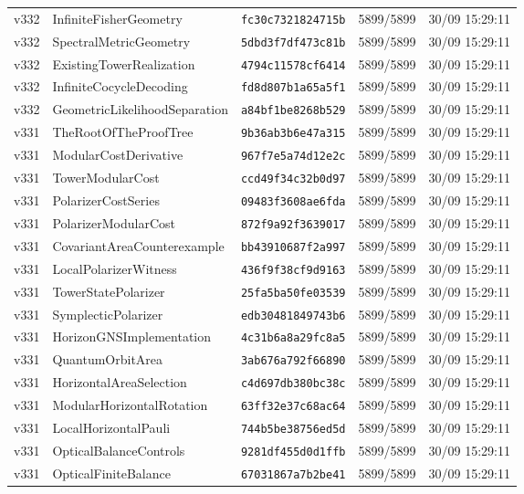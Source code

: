 \documentclass[11pt]{article}
\theoremstyle{definition}\newtheorem{deriv}{Derivation}
\begin{document}
{\begin{longtable}{@{}lllll@{}}
v332 & InfiniteFisherGeometry & \texttt{fc30c7321824715b} & 5899/5899 & 30/09 15:29:11 \\
v332 & SpectralMetricGeometry & \texttt{5dbd3f7df473c81b} & 5899/5899 & 30/09 15:29:11 \\
v332 & ExistingTowerRealization & \texttt{4794c11578cf6414} & 5899/5899 & 30/09 15:29:11 \\
v332 & InfiniteCocycleDecoding & \texttt{fd8d807b1a65a5f1} & 5899/5899 & 30/09 15:29:11 \\
v332 & GeometricLikelihoodSeparation & \texttt{a84bf1be8268b529} & 5899/5899 & 30/09 15:29:11 \\
v331 & TheRootOfTheProofTree & \texttt{9b36ab3b6e47a315} & 5899/5899 & 30/09 15:29:11 \\
v331 & ModularCostDerivative & \texttt{967f7e5a74d12e2c} & 5899/5899 & 30/09 15:29:11 \\
v331 & TowerModularCost & \texttt{ccd49f34c32b0d97} & 5899/5899 & 30/09 15:29:11 \\
v331 & PolarizerCostSeries & \texttt{09483f3608ae6fda} & 5899/5899 & 30/09 15:29:11 \\
v331 & PolarizerModularCost & \texttt{872f9a92f3639017} & 5899/5899 & 30/09 15:29:11 \\
v331 & CovariantAreaCounterexample & \texttt{bb43910687f2a997} & 5899/5899 & 30/09 15:29:11 \\
v331 & LocalPolarizerWitness & \texttt{436f9f38cf9d9163} & 5899/5899 & 30/09 15:29:11 \\
v331 & TowerStatePolarizer & \texttt{25fa5ba50fe03539} & 5899/5899 & 30/09 15:29:11 \\
v331 & SymplecticPolarizer & \texttt{edb30481849743b6} & 5899/5899 & 30/09 15:29:11 \\
v331 & HorizonGNSImplementation & \texttt{4c31b6a8a29fc8a5} & 5899/5899 & 30/09 15:29:11 \\
v331 & QuantumOrbitArea & \texttt{3ab676a792f66890} & 5899/5899 & 30/09 15:29:11 \\
v331 & HorizontalAreaSelection & \texttt{c4d697db380bc38c} & 5899/5899 & 30/09 15:29:11 \\
v331 & ModularHorizontalRotation & \texttt{63ff32e37c68ac64} & 5899/5899 & 30/09 15:29:11 \\
v331 & LocalHorizontalPauli & \texttt{744b5be38756ed5d} & 5899/5899 & 30/09 15:29:11 \\
v331 & OpticalBalanceControls & \texttt{9281df455d0d1ffb} & 5899/5899 & 30/09 15:29:11 \\
v331 & OpticalFiniteBalance & \texttt{67031867a7b2be41} & 5899/5899 & 30/09 15:29:11 \\

\end{longtable}}
\end{document}
